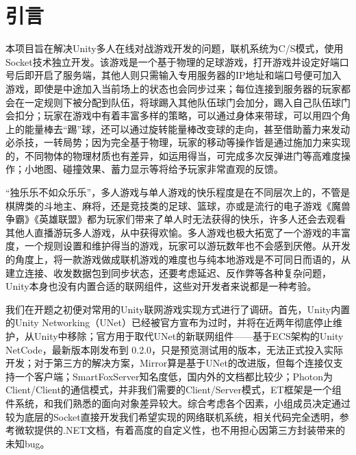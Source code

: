\documentclass[conference]{IEEEtran}
\begin{document}





\begin{abstract}
  本项目是基于Unity的多人球类物理游戏，用Socket实现了联网对战，而没有使用内置或第三方的联网组件。玩家会依照规则分配到不同的队伍，灵活运用操作、技能与战术来进球得分。本项目做到了完备的游戏性、可靠的联网技术、美观及时的反馈三者有机统一，服务端与客户端统一为一个项目，在游戏程序中依仗用户操作和代码逻辑上的不同加以切换。项目中各部分各司其职，耦合度较低，且互相调用比较方便，为未来的开发、调试、增量都奠定了基础。
\end{abstract}


\section{引言}

本项目旨在解决Unity多人在线对战游戏开发的问题，联机系统为C/S模式，使用Socket技术独立开发。该游戏是一个基于物理的足球游戏，打开游戏并设定好端口号后即开启了服务端，其他人则只需输入专用服务器的IP地址和端口号便可加入游戏，即使是中途加入当前场上的状态也会同步过来；每位连接到服务器的玩家都会在一定规则下被分配到队伍，将球踢入其他队伍球门会加分，踢入自己队伍球门会扣分；玩家在游戏中有着丰富多样的策略，可以通过身体来带球，可以用四个角上的能量棒去“踢”球，还可以通过旋转能量棒改变球的走向，甚至借助蓄力来发动必杀技，一转局势；因为完全基于物理，玩家的移动等操作皆是通过施加力来实现的，不同物体的物理材质也有差异，如运用得当，可完成多次反弹进门等高难度操作；小地图、碰撞效果、蓄力显示等将给予玩家非常直观的反馈。

“独乐乐不如众乐乐”，多人游戏与单人游戏的快乐程度是在不同层次上的，不管是棋牌类的斗地主、麻将，还是竞技类的足球、篮球，亦或是流行的电子游戏《魔兽争霸》《英雄联盟》都为玩家们带来了单人时无法获得的快乐，许多人还会去观看其他人直播游玩多人游戏，从中获得欢愉。多人游戏也极大拓宽了一个游戏的丰富度，一个规则设置和维护得当的游戏，玩家可以游玩数年也不会感到厌倦。从开发的角度上，将一款游戏做成联机游戏的难度也与纯本地游戏是不可同日而语的，从建立连接、收发数据包到同步状态，还要考虑延迟、反作弊等各种复杂问题，Unity本身也没有内置合适的联网组件，这些对开发者来说都是一种考验。

我们在开题之初便对常用的Unity联网游戏实现方式进行了调研。首先，Unity内置的Unity Networking（UNet）已经被官方宣布为过时，并将在近两年彻底停止维护，从Unity中移除\cite{UNet过时}；官方用于取代UNet的新联网组件——基于ECS架构的Unity NetCode，最新版本刚发布到 0.2.0，只是预览测试用的版本，无法正式投入实际开发；对于第三方的解决方案，Mirror算是基于UNet的改进版，但每个连接仅支持一个客户端；SmartFoxServer知名度低，国内外的文档都比较少；Photon为Client/Client的通信模式，并非我们需要的Client/Server模式\cite{优缺点比较}，ET框架是一个组件系统，和我们熟悉的面向对象差异较大。综合考虑各个因素，小组成员决定通过较为底层的Socket直接开发我们希望实现的网络联机系统，相关代码完全透明，参考微软提供的.NET文档，有着高度的自定义性，也不用担心因第三方封装带来的未知bug。
\end{document}
